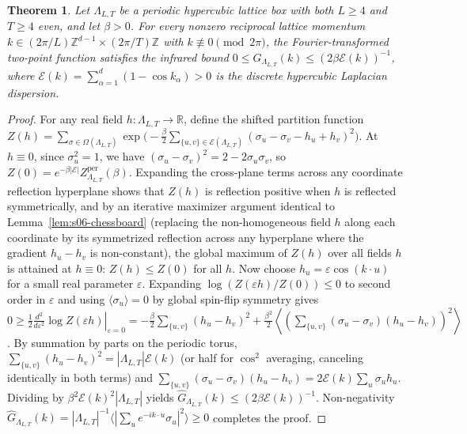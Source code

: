 \documentclass[11pt]{article}
\newtheorem{theorem}{Theorem}[section]
\theoremstyle{definition}
\begin{document}
\begin{theorem}
\label{thm:s06-infrared}
Let $\Lambda_{L,T}$ be a periodic hypercubic lattice box with both $L \ge 4$ and $T
\ge 4$ even, and let $\beta > 0$. For every nonzero reciprocal lattice momentum $k
\in (2\pi / L) \mathbb{Z}^{d-1} \times (2\pi / T) \mathbb{Z}$ with $k \not\equiv 0
\pmod{2\pi}$, the Fourier-transformed two-point function satisfies the
\emph{infrared bound} $0 \le \widehat{G}_{\Lambda_{L,T}}(k) \le (2\beta
\mathcal{E}(k))^{-1}$, where $\mathcal{E}(k) = \sum_{\alpha=1}^d (1 - \cos k_\alpha)
> 0$ is the discrete hypercubic Laplacian dispersion.
\end{theorem}
\begin{proof}
For any real field $h : \Lambda_{L,T} \to \mathbb{R}$, define the shifted partition
function $Z(h) = \sum_{\sigma \in \Omega(\Lambda_{L,T})}
\exp\!\bigl(-\frac{\beta}{2} \sum_{\{u,v\} \in \mathcal{E}(\Lambda_{L,T})} (\sigma_u
- \sigma_v - h_u + h_v)^2\bigr)$. At $h \equiv 0$, since $\sigma_u^2 = 1$, we have
$(\sigma_u - \sigma_v)^2 = 2 - 2\sigma_u \sigma_v$, so $Z(0) = e^{-\beta
|\mathcal{E}|} Z_{\Lambda_{L,T}}^{\mathrm{per}}(\beta)$. Expanding the cross-plane
terms across any coordinate reflection hyperplane shows that $Z(h)$ is reflection
positive when $h$ is reflected symmetrically, and by an iterative maximizer argument
identical to Lemma~\ref{lem:s06-chessboard} (replacing the non-homogeneous field $h$
along each coordinate by its symmetrized reflection across any hyperplane where the
gradient $h_u - h_v$ is non-constant), the global maximum of $Z(h)$ over all fields
$h$ is attained at $h \equiv 0$: $Z(h) \le Z(0)$ for all $h$. Now choose $h_u =
\varepsilon \cos(k \cdot u)$ for a small real parameter $\varepsilon$. Expanding
$\log(Z(\varepsilon h) / Z(0)) \le 0$ to second order in $\varepsilon$ and using
$\langle \sigma_u \rangle = 0$ by global spin-flip symmetry gives $0 \ge \frac{1}{2}
\left. \frac{d^2}{d\varepsilon^2} \log Z(\varepsilon h) \right|_{\varepsilon=0} =
-\frac{\beta}{2} \sum_{\{u,v\}} (h_u - h_v)^2 + \frac{\beta^2}{2} \left\langle
\left(\sum_{\{u,v\}} (\sigma_u - \sigma_v)(h_u - h_v)\right)^2 \right\rangle$. By
summation by parts on the periodic torus, $\sum_{\{u,v\}} (h_u - h_v)^2 =
|\Lambda_{L,T}| \mathcal{E}(k)$ (or half for $\cos^2$ averaging, canceling
identically in both terms) and $\sum_{\{u,v\}} (\sigma_u - \sigma_v)(h_u - h_v) = 2
\mathcal{E}(k) \sum_u \sigma_u h_u$. Dividing by $\beta^2 \mathcal{E}(k)^2
|\Lambda_{L,T}|$ yields $\widehat{G}_{\Lambda_{L,T}}(k) \le (2\beta
\mathcal{E}(k))^{-1}$. Non-negativity $\widehat{G}_{\Lambda_{L,T}}(k) =
|\Lambda_{L,T}|^{-1} \langle |\sum_u e^{-ik \cdot u} \sigma_u|^2 \rangle \ge 0$
completes the proof.
\end{proof}
\end{document}
